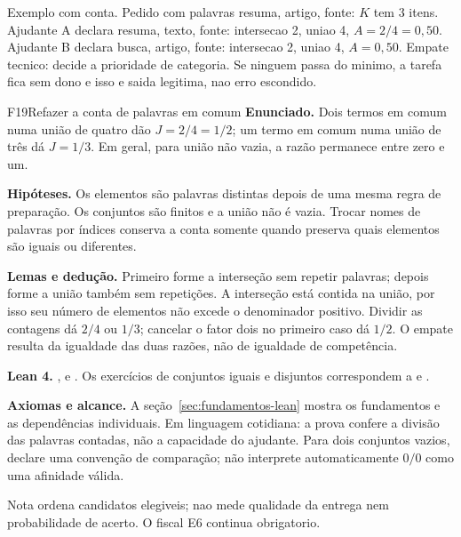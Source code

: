 \begin{resultado}
Exemplo com conta. Pedido com palavras resuma, artigo, fonte: $K$ tem 3 itens. Ajudante A declara resuma, texto, fonte: intersecao 2, uniao 4, $A=2/4=0{,}50$. Ajudante B declara busca, artigo, fonte: intersecao 2, uniao 4, $A=0{,}50$. Empate tecnico: decide a prioridade de categoria. Se ninguem passa do minimo, a tarefa fica sem dono e isso e saida legitima, nao erro escondido.
\end{resultado}

\begin{formalizacao}{F19}{Refazer a conta de palavras em comum}
\textbf{Enunciado.} Dois termos em comum numa união de quatro dão
$J=2/4=1/2$; um termo em comum numa união de três dá $J=1/3$.
Em geral, para união não vazia, a razão permanece entre zero e um.

\textbf{Hipóteses.} Os elementos são palavras distintas depois de uma
mesma regra de preparação. Os conjuntos são finitos e a união não é vazia.
Trocar nomes de palavras por índices conserva a conta somente quando
preserva quais elementos são iguais ou diferentes.

\textbf{Lemas e dedução.} Primeiro forme a interseção sem repetir palavras;
depois forme a união também sem repetições. A interseção está contida na
união, por isso seu número de elementos não excede o denominador positivo.
Dividir as contagens dá $2/4$ ou $1/3$; cancelar o fator dois no primeiro
caso dá $1/2$. O empate resulta da igualdade das duas razões, não de
igualdade de competência.

\textbf{Lean 4.} ,
 e
.
Os exercícios de conjuntos iguais e disjuntos correspondem a
 e
.

\textbf{Axiomas e alcance.} A seção~\ref{sec:fundamentos-lean} mostra os
fundamentos e as dependências individuais. Em linguagem cotidiana: a
prova confere a divisão das palavras contadas, não a capacidade do
ajudante. Para dois conjuntos vazios, declare uma convenção de comparação;
não interprete automaticamente $0/0$ como uma afinidade válida.
\end{formalizacao}

\begin{limite}
Nota ordena candidatos elegiveis; nao mede qualidade da entrega nem probabilidade de acerto. O fiscal E6 continua obrigatorio.
\end{limite}

